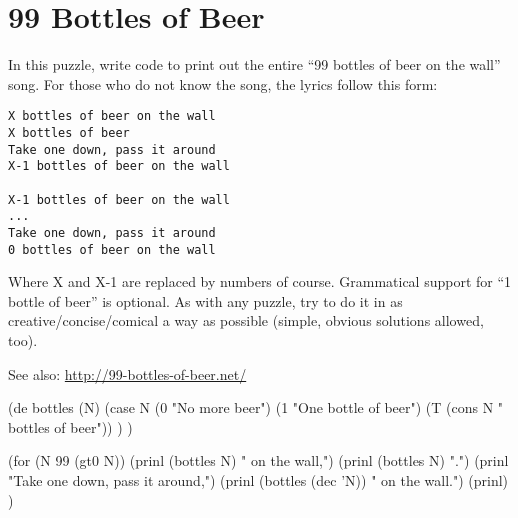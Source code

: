 \pagebreak{}
\section*{99 Bottles of Beer}


In this puzzle, write code to print out the entire ``99 bottles of beer
on the wall'' song. For those who do not know the song, the lyrics
follow this form:

\begin{verbatim}
X bottles of beer on the wall
X bottles of beer
Take one down, pass it around
X-1 bottles of beer on the wall

X-1 bottles of beer on the wall
...
Take one down, pass it around
0 bottles of beer on the wall
\end{verbatim}

Where X and X-1 are replaced by numbers of course. Grammatical support
for ``1 bottle of beer'' is optional. As with any puzzle, try to do it
in as creative/concise/comical a way as possible (simple, obvious
solutions allowed, too).

See also:
\href{http://99-bottles-of-beer.net/}{http://99-bottles-of-beer.net/}


\begin{wideverbatim}

(de bottles (N)
   (case N
      (0 "No more beer")
      (1 "One bottle of beer")
      (T (cons N " bottles of beer")) ) )

(for (N 99 (gt0 N))
   (prinl (bottles N) " on the wall,")
   (prinl (bottles N) ".")
   (prinl "Take one down, pass it around,")
   (prinl (bottles (dec 'N)) " on the wall.")
   (prinl) )

\end{wideverbatim}




% 
